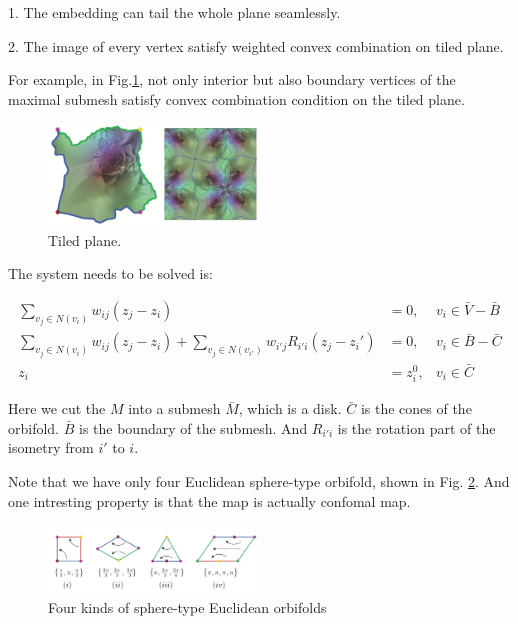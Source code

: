 \documentclass[fleqn,10pt]{wlscirep}
\begin{document}
1. The embedding can tail the whole plane seamlessly.

2. The image of every vertex satisfy weighted convex combination on tiled plane.

For example, in Fig.\ref{fig:tile}, not only interior but also boundary vertices of the maximal submesh satisfy convex combination condition on the tiled plane.

\begin{figure}
\centering
\includegraphics[width=0.5\textwidth]{images/euc_orbifold}
\caption{Tiled plane.}
\label{fig:tile}
\end{figure}

The system needs to be solved is:

\begin{equation}
\begin{split}
\sum_{v_j \in N(v_i)}w_{ij}(z_j - z_i) &= 0, &v_i \in \bar{V}-\bar{B}\\
\sum_{v_j \in N(v_i)}w_{ij}(z_j - z_i) + \sum_{v_j\in N(v_{i'})} w_{i'j}R_{i'i}(z_j - z_i')&= 0, &v_i \in \bar{B} - \bar{C}\\
z_i &= z_i^0 , &v_i \in \bar{C}
\end{split}
\end{equation}

Here we cut the $M$ into a submesh $\bar{M}$, which is a disk. $\bar{C}$ is the cones of the orbifold. $\bar{B}$ is
the boundary of the submesh. And $R_{i'i}$ is the rotation part of the isometry from $i'$ to $i$.

Note that we have only four Euclidean sphere-type orbifold, shown in Fig. \ref{fig:four-kinds}. And one intresting property is that the map is actually confomal map.

\begin{figure}
\centering
\includegraphics[width=0.5\textwidth]{images/four_euc_orbifolds}
\caption{Four kinds of sphere-type Euclidean orbifolds}
\label{fig:four-kinds}
\end{figure}
\end{document}
